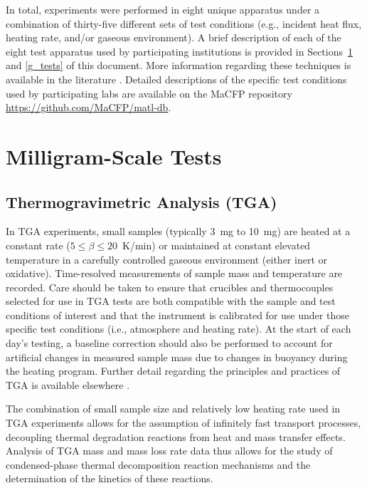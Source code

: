 \documentclass{book}
\begin{document}
In total, experiments were performed in eight unique apparatus under a combination of thirty-five different sets of test conditions (e.g., incident heat flux, heating rate, and/or gaseous environment). A brief description of each of the eight test apparatus used by participating institutions is provided in Sections~\ref{mg_tests} and \ref{g_tests} of this document. More information regarding these techniques is available in the literature \cite{brown2001introduction,SFPEHandbookThermalDecomp}. Detailed descriptions of the specific test conditions used by participating labs are available on the MaCFP repository \href{https://github.com/MaCFP/matl-db}{https://github.com/MaCFP/matl-db}.


\section{Milligram-Scale Tests}
\label{mg_tests}

\subsection{Thermogravimetric Analysis (TGA)}

In TGA experiments, small samples (typically 3~mg to 10~mg) are heated at a constant rate ($5\le\beta\le20$~K/min) or maintained at constant elevated temperature in a carefully controlled gaseous environment (either inert or oxidative). Time-resolved measurements of sample mass and temperature are recorded. Care should be taken to ensure that crucibles and thermocouples selected for use in TGA tests are both compatible with the sample and test conditions of interest and that the instrument is calibrated for use under those specific test conditions (i.e., atmosphere and heating rate). At the start of each day’s testing, a baseline correction should also be performed to account for artificial changes in measured sample mass due to changes in buoyancy during the heating program. Further detail regarding the principles and practices of TGA is available elsewhere \cite{coats1963thermogravimetric}.

The combination of small sample size and relatively low heating rate used in TGA experiments allows for the assumption of infinitely fast transport processes, decoupling thermal degradation reactions from heat and mass transfer effects. Analysis of TGA mass and mass loss rate data thus allows for the study of condensed-phase thermal decomposition reaction mechanisms and the determination of the kinetics of these reactions.
\end{document}
